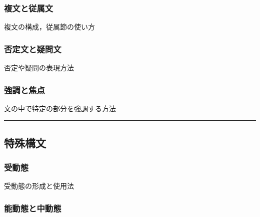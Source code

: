 \documentclass[
  japanese,
]{article}
\providecommand{\tightlist}{%
  \setlength{\itemsep}{0pt}\setlength{\parskip}{0pt}}
\begin{document}
\subsubsection{複文と従属文}\label{section6.2}

複文の構成，従属節の使い方

\begin{description}
\tightlist
\item[]
\end{description}

\subsubsection{否定文と疑問文}\label{section6.3}

否定や疑問の表現方法

\begin{description}
\tightlist
\item[]
\end{description}

\subsubsection{強調と焦点}\label{section6.4}

文の中で特定の部分を強調する方法

\begin{description}
\tightlist
\item[]
\end{description}

\begin{center}\rule{0.5\linewidth}{0.5pt}\end{center}

\subsection{特殊構文}\label{chapter7}

\subsubsection{受動態}\label{section7.1}

受動態の形成と使用法

\begin{description}
\tightlist
\item[]
\end{description}

\subsubsection{能動態と中動態}\label{section7.2}
\end{document}
